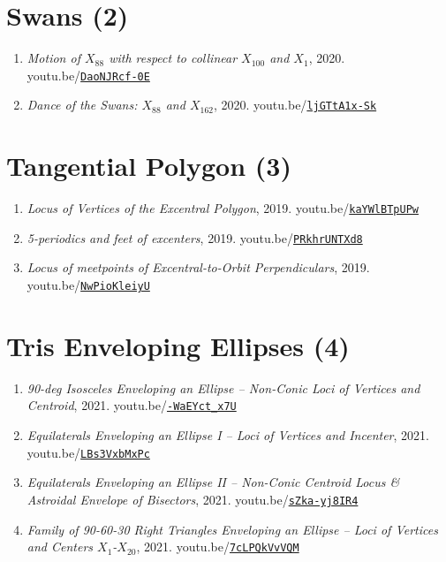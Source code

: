 \documentclass[12pt]{article}
\begin{document}
\section{Swans (2)}

\begin{enumerate}[resume]
\item \textit{Motion of $X_{88}$ with respect to collinear $X_{100}$ and $X_{1}$}, 2020. youtu.be/\href{https://youtu.be/DaoNJRcf-0E}{\nolinkurl{DaoNJRcf-0E}}
\item \textit{Dance of the Swans: $X_{88}$ and $X_{162}$}, 2020. youtu.be/\href{https://youtu.be/ljGTtA1x-Sk}{\nolinkurl{ljGTtA1x-Sk}}
\end{enumerate}

\section{Tangential Polygon (3)}

\begin{enumerate}[resume]
\item \textit{Locus of Vertices of the Excentral Polygon}, 2019. youtu.be/\href{https://youtu.be/kaYWlBTpUPw}{\nolinkurl{kaYWlBTpUPw}}
\item \textit{5-periodics and feet of excenters}, 2019. youtu.be/\href{https://youtu.be/PRkhrUNTXd8}{\nolinkurl{PRkhrUNTXd8}}
\item \textit{Locus of meetpoints of Excentral-to-Orbit Perpendiculars}, 2019. youtu.be/\href{https://youtu.be/NwPioKleiyU}{\nolinkurl{NwPioKleiyU}}
\end{enumerate}

\section{Tris Enveloping Ellipses (4)}

\begin{enumerate}[resume]
\item \textit{90-deg Isosceles Enveloping an Ellipse -- Non-Conic Loci of Vertices and Centroid}, 2021. youtu.be/\href{https://youtu.be/-WaEYct_x7U}{\nolinkurl{-WaEYct\_x7U}}
\item \textit{Equilaterals Enveloping an Ellipse I -- Loci of Vertices and Incenter}, 2021. youtu.be/\href{https://youtu.be/LBs3VxbMxPc}{\nolinkurl{LBs3VxbMxPc}}
\item \textit{Equilaterals Enveloping an Ellipse II -- Non-Conic Centroid Locus \& Astroidal Envelope of Bisectors}, 2021. youtu.be/\href{https://youtu.be/sZka-yj8IR4}{\nolinkurl{sZka-yj8IR4}}
\item \textit{Family of 90-60-30 Right Triangles Enveloping an Ellipse -- Loci of Vertices and Centers $X_{1}$-$X_{20}$}, 2021. youtu.be/\href{https://youtu.be/7cLPQkVvVQM}{\nolinkurl{7cLPQkVvVQM}}
\end{enumerate}
\end{document}
